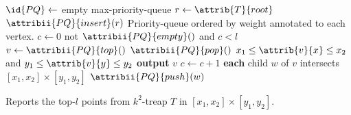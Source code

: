 \begin{algorithm}[htb]
  \begin{codebox}
    \li $\id{PQ} \gets$ empty max-priority-queue
    \li $r \gets \attrib{T}{root}$
    \li $\attribii{PQ}{insert}(r)$ \>\>\>\>\Comment Priority-queue ordered by weight annotated to each vertex.
    \li $c \gets 0$
    \li \While not $\attribii{PQ}{empty}()$ and $c < l$
        \Do
    \li   $v \gets \attribii{PQ}{top}()$
    \li   $\attribii{PQ}{pop}()$
    \li   \If $x_1 \leq \attrib{v}{x} \leq x_2$ and $y_1 \leq \attrib{v}{y} \leq y_2$
          \Then
    \li     \textbf{output} $v$
    \li     $c \gets c + 1$
          \End
    \li   \For \textbf{each} child $w$ of $v$
          \Do
    \li     \If {} intersects $[x_1, x_2] \times [y_1, y_2]$
            \Then
    \li       $\attribii{PQ}{push}(w)$
            \End
          \End
        \End
  \end{codebox}
  \caption{Reports the top-$l$ points from $k^2$-treap $T$ in $[x_1, x_2] \times [y_1, y_2]$.}
  \label{alg:k2TreapReport}
\end{algorithm}
